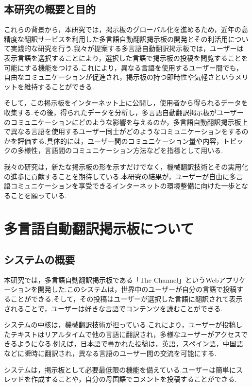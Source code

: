 \documentclass[b5paper,12pt]{jsreport}
\begin{document}
\section{本研究の概要と目的}

これらの背景から，本研究では，掲示板のグローバル化を進めるため，近年の高精度な翻訳サービスを利用した多言語自動翻訳掲示板の開発とその利活用について実践的な研究を行う.我々が提案する多言語自動翻訳掲示板では，ユーザーは表示言語を選択することにより，選択した言語で掲示板の投稿を閲覧することを可能にする機能をつける.これにより，異なる言語を使用するユーザー間でも，自由なコミュニケーションが促進され，掲示板の持つ即時性や気軽さというメリットを維持することができる.

そして，この掲示板をインターネット上に公開し，使用者から得られるデータを収集する.その後，得られたデータを分析し，多言語自動翻訳掲示板がユーザーのコミュニケーションにどのような影響を与えるのか，多言語自動翻訳掲示板上で異なる言語を使用するユーザー同士がどのようなコミュニケーションをするのかを評価する.具体的には，ユーザー間のコミュニケーション量や内容，トピックの多様性，言語間のコミュニケーション方法などを指標として用いる.

我々の研究は，新たな掲示板の形を示すだけでなく，機械翻訳技術とその実用化の進歩に貢献することを期待している.本研究の結果が，ユーザーが自由に多言語コミュニケーションを享受できるインターネットの環境整備に向けた一歩となることを願っている.

\chapter{多言語自動翻訳掲示板について}

\section{システムの概要}

本研究では，多言語自動翻訳掲示板である「The Channel」というWebアプリケーションを開発した.このシステムは，世界中のユーザーが自分の言語で投稿することができる.そして，その投稿はユーザーが選択した言語に翻訳されて表示されることで，ユーザーは好きな言語でコンテンツを読むことができる.

システムの中核は，機械翻訳技術が担っている.これにより，ユーザーが投稿したテキストはリアルタイムで他の言語に翻訳され，多様なユーザーがアクセスできるようになる.例えば，日本語で書かれた投稿は，英語，スペイン語，中国語などに瞬時に翻訳され，異なる言語のユーザー間の交流を可能にする.

システムは，掲示板として必要最低限の機能を備えている.ユーザーは簡単にスレッドを作成することや，自分の母国語でコメントを投稿することができる.
\end{document}
